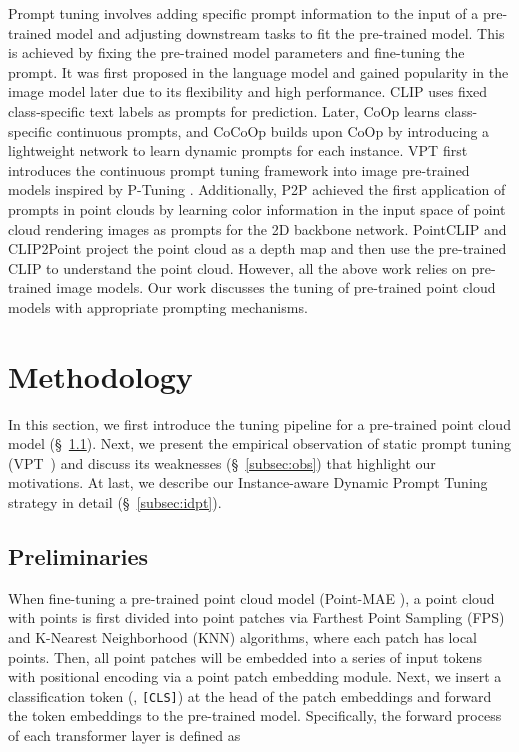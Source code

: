 \documentclass[10pt,twocolumn,letterpaper]{article}
\begin{document}
Prompt tuning involves adding specific prompt information to the input of a pre-trained model and adjusting downstream tasks to fit the pre-trained model. This is achieved by fixing the pre-trained model parameters and fine-tuning the prompt. It was first proposed in the language model \cite{brown2020language,gao2020making,lester2021power,liu2023pre,liu2021p,liu2021gpt} and gained popularity in the image model \cite{radford2021learning,rao2022denseclip,tsimpoukelli2021multimodal,zhou2022learning,zhou2022conditional} later due to its flexibility and high performance. CLIP \cite{radford2021learning} uses fixed class-specific text labels as prompts for prediction. Later, CoOp \cite{zhou2022learning} learns class-specific continuous prompts, and CoCoOp \cite{zhou2022conditional} builds upon CoOp by introducing a lightweight network to learn dynamic prompts for each instance. VPT \cite{jia2022visual} first introduces the continuous prompt tuning framework into image pre-trained models inspired by P-Tuning \cite{liu2021p}. Additionally, P2P \cite{wang2022p2p} achieved the first application of prompts in point clouds by learning color information in the input space of point cloud rendering images as prompts for the 2D backbone network. PointCLIP \cite{zhang2022pointclip} and CLIP2Point \cite{huang2022clip2point} project the point cloud as a depth map and then use the pre-trained CLIP \cite{radford2021learning} to understand the point cloud.  However, all the above work relies on pre-trained image models. Our work discusses the tuning of pre-trained point cloud models with appropriate prompting mechanisms.


\section{Methodology}
In this section, we first introduce the tuning pipeline for a pre-trained point cloud model (\S~\ref{subsec:prelim}). Next, we present the empirical observation of static prompt tuning (\eg VPT~\cite{jia2022visual}) and discuss its weaknesses (\S~\ref{subsec:obs}) that highlight our motivations. 
At last, we describe our Instance-aware Dynamic Prompt Tuning strategy in detail (\S~\ref{subsec:idpt}). 

\subsection{Preliminaries}
\label{subsec:prelim}
When fine-tuning a pre-trained point cloud model (\eg Point-MAE \cite{pang2022masked}), a point cloud  with  points is first divided into  point patches  via Farthest Point Sampling (FPS) and K-Nearest Neighborhood (KNN) algorithms, where each patch has  local points. Then, all point patches will be embedded into a series of input tokens  with positional encoding via a point patch embedding module. Next, we insert a classification token (\ie, \texttt{[CLS]})  at the head of the patch embeddings and forward the token embeddings to the pre-trained model. Specifically, the forward process of each transformer layer is defined as
\end{document}
